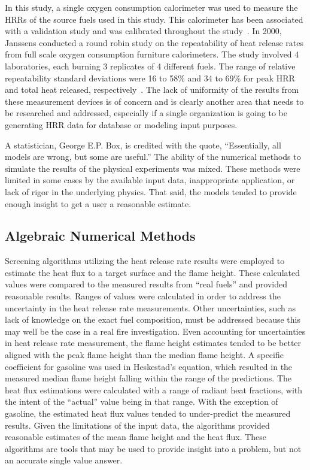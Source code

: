 \documentclass[twoside]{uocthesis}
\begin{document}
{In this study, a single oxygen consumption calorimeter was used to measure the HRRs of the source fuels used in this study.  This calorimeter has been associated with a validation study and was calibrated throughout the study~\cite{Bryant:2003b}.  In 2000, Janssens conducted a round robin study on the repeatability of heat release rates from full scale oxygen consumption furniture calorimeters.  The study involved 4 laboratories, each burning 3 replicates of 4 different fuels. The range of relative repeatability standard deviations were 16 to 58\% and 34 to 69\% for peak HRR and total heat released, respectively~\cite{Janssens:2002}.  The lack of uniformity of the results from these measurement devices is of concern and is clearly another area that needs to be researched and addressed, especially if a single organization is going to be generating HRR data for database or modeling input purposes.         

A statistician, George E.P. Box, is credited with the quote, ``Essentially, all models are wrong, but some are useful.''  The ability of the numerical methods to simulate the results of the physical experiments was mixed.  These methods were limited in some cases by the available input data, inappropriate application, or lack of rigor in the underlying physics.  That said, the models tended to provide enough insight to get a user a reasonable estimate.     

\subsection{Algebraic Numerical Methods}

Screening algorithms utilizing the heat release rate results were employed to estimate the heat flux to a target surface and the flame height.  These calculated values were compared to the measured results from “real fuels” and provided reasonable results.  Ranges of values were calculated in order to address the uncertainty in the heat release rate measurements.  Other uncertainties, such as lack of knowledge on the exact fuel composition, must be addressed because this may well be the case in a real fire investigation.  Even accounting for uncertainties in heat release rate measurement, the flame height estimates tended to be better aligned with the peak flame height than the median flame height.  A specific coefficient for gasoline was used in Heskestad's equation, which resulted in the measured median flame height falling within the range of the predictions.  The heat flux estimations were calculated with a range of radiant heat fractions, with the intent of the “actual” value being in that range.  With the exception of gasoline, the estimated heat flux values tended to under-predict the measured results.  Given the limitations of the input data, the algorithms provided reasonable estimates of the mean flame height and the heat flux.  These algorithms are tools that may be used to provide insight into a problem, but not an accurate single value answer.

}
\end{document}
